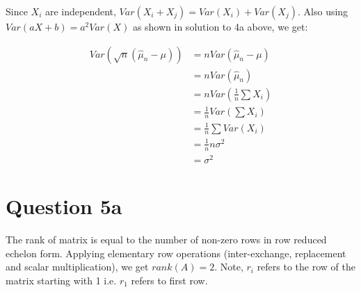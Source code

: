 \documentclass{article}
\begin{document}
    Since $X_i$ are independent, $Var(X_i + X_j) = Var(X_i) + Var(X_j)$. Also using $Var(aX+b) = a^{2}Var(X)$ as shown in solution to 4a above, we get:

    \begin{align*}
        Var(\sqrt{n}(\widehat{\mu}_{n} - \mu))  & = n Var(\widehat{\mu}_{n} - \mu) \\
                                                & = n Var(\widehat{\mu}_{n}) \\
                                                & = n Var(\frac{1}{n} \sum X_i) \\
                                                & = \frac{1}{n} Var(\sum X_i) \\
                                                & = \frac{1}{n} \sum Var(X_i) \\
                                                & = \frac{1}{n} n \sigma^{2} \\
                                                & = \sigma^{2}
    \end{align*}

    \section*{Question 5a}
    The rank of matrix is equal to the number of non-zero rows in row reduced echelon form. Applying elementary row operations (inter-exchange, replacement and scalar multiplication), we get $rank(A) = 2$. Note, $r_i$ refers to the row of the matrix starting with 1 i.e. $r_1$ refers to first row.
\end{document}

